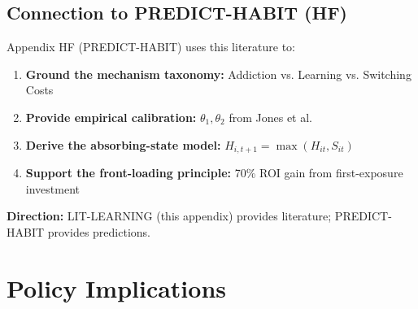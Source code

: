 \documentclass[11pt, a4paper]{article}
\begin{document}
\subsection{Connection to PREDICT-HABIT (HF)}

\begin{tcolorbox}[colback=blue!5!white, colframe=blue!75!black,
    title=Integration: LIT-LEARNING $\leftrightarrow$ PREDICT-HABIT]

Appendix HF (PREDICT-HABIT) uses this literature to:

\begin{enumerate}[nosep]
    \item \textbf{Ground the mechanism taxonomy:} Addiction vs. Learning vs. Switching Costs
    \item \textbf{Provide empirical calibration:} $\theta_1, \theta_2$ from Jones et al.
    \item \textbf{Derive the absorbing-state model:} $H_{i,t+1} = \max(H_{it}, S_{it})$
    \item \textbf{Support the front-loading principle:} 70\% ROI gain from first-exposure investment
\end{enumerate}

\textbf{Direction:} LIT-LEARNING (this appendix) provides literature; PREDICT-HABIT provides predictions.

\end{tcolorbox}


\section{Policy Implications}
\label{sec:lrn-policy}
\end{document}

